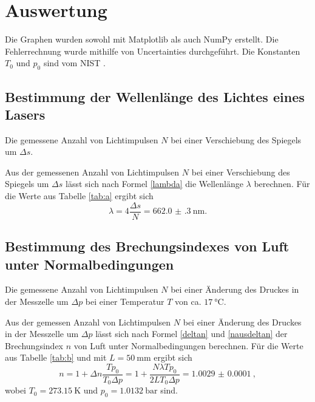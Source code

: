 \section{Auswertung}
\label{sec:Auswertung}


Die Graphen wurden sowohl mit Matplotlib \cite{matplotlib} als auch NumPy \cite{numpy} erstellt. Die
Fehlerrechnung wurde mithilfe von Uncertainties \cite{uncertainties} durchgeführt.
Die Konstanten $T_0$ und $p_0$ sind vom NIST \cite{nistgov}.

\subsection{Bestimmung der Wellenlänge des Lichtes eines Lasers}
\begin{table}
	\centering
	\caption{Die gemessene Anzahl von Lichtimpulsen $N$ bei einer Verschiebung des Spiegels um $\Delta s$.}
	
	\label{tab:a}
\end{table}
Aus der gemessenen Anzahl von Lichtimpulsen $N$ bei einer Verschiebung des Spiegels um $\Delta s$ lässt sich nach Formel \eqref{lambda} die Wellenlänge $\lambda$ berechnen.
Für die Werte aus Tabelle \ref{tab:a} ergibt sich
\begin{equation}
	\lambda = 4 \frac{\Delta s}{N}=\SI{662.0(3)}{\nano\meter}.
\end{equation}


\subsection{Bestimmung des Brechungsindexes von Luft unter Normalbedingungen}
\begin{table}
	\centering
	\caption{Die gemessene Anzahl von Lichtimpulsen $N$ bei einer Änderung des Druckes in der Messzelle um $\Delta p$ bei einer Temperatur $T$ von ca. $\SI{17}{\degreeCelsius}$.}
	
	\label{tab:b}
\end{table}
Aus der gemessen Anzahl von Lichtimpulsen $N$ bei einer Änderung des Druckes in der Messzelle um $\Delta p$ lässt sich nach Formel \eqref{deltan} und \eqref{nausdeltan} der Brechungsindex $n$ von Luft unter Normalbedingungen berechnen.
Für die Werte aus Tabelle \ref{tab:b} und mit $L=\SI{50}{\milli\meter}$ ergibt sich
\begin{equation}
	n = 1 + \Delta n \frac{T p_0}{T_0 \Delta p} = 1+ \frac{N \lambda T p_0}{2 L T_0 \Delta p} = \SI{1.0029(1)}{},
\end{equation}
wobei $T_0=\SI{273,15}{\kelvin}$ und $p_0=\SI{1,0132}{\bar}$ sind.
